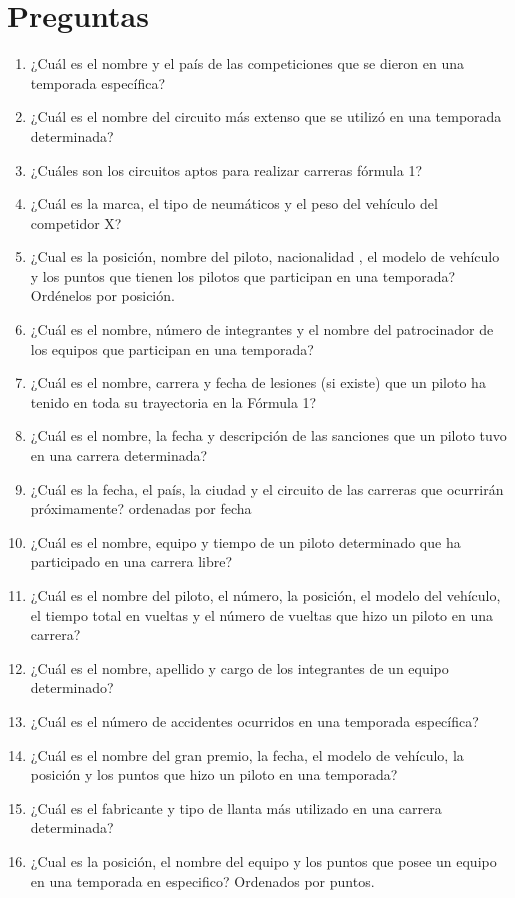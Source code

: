 \documentclass{article}
\begin{document}
	\section{Preguntas}
	\begin{enumerate}
		\item ¿Cuál es el nombre y el país de las competiciones que se dieron en una temporada específica?
		\item ¿Cuál es el nombre del circuito más extenso que se utilizó en una temporada determinada?
		\item ¿Cuáles son los circuitos aptos para realizar carreras fórmula 1?
		\item ¿Cuál es la marca, el tipo de neumáticos y el peso del vehículo del competidor X?
		\item ¿Cual es la posición, nombre del piloto, nacionalidad , el modelo de vehículo y los puntos que tienen los pilotos que participan en una temporada? Ordénelos por posición.
		\item ¿Cuál es el nombre, número de integrantes y el nombre del patrocinador de los equipos que participan en una temporada?
		\item ¿Cuál es el nombre, carrera y fecha de lesiones (si existe) que un piloto ha tenido en toda su trayectoria en la Fórmula 1?
		\item ¿Cuál es el nombre, la fecha y descripción de las sanciones que un piloto tuvo en una carrera determinada?
		\item ¿Cuál es la fecha, el país, la ciudad y el circuito de las carreras que ocurrirán próximamente? ordenadas por fecha
		\item ¿Cuál es el nombre, equipo y tiempo de un piloto determinado que ha participado en una carrera libre?
		\item ¿Cuál es el nombre del piloto, el número, la posición, el modelo del vehículo, el tiempo total en vueltas y el número de vueltas que hizo un piloto en una carrera?
		\item ¿Cuál es el nombre, apellido y cargo de los integrantes de un equipo determinado?
		\item ¿Cuál es el número de accidentes ocurridos en una temporada específica?
		\item ¿Cuál es el nombre del gran premio, la fecha, el modelo de vehículo, la posición y los puntos que hizo un piloto en una temporada?
		\item ¿Cuál es el fabricante y tipo de llanta más utilizado en una carrera determinada?
		\item ¿Cual es la posición, el nombre del equipo y los puntos que posee un equipo en una temporada en especifico? Ordenados por puntos.

\end{enumerate}
\end{document}
